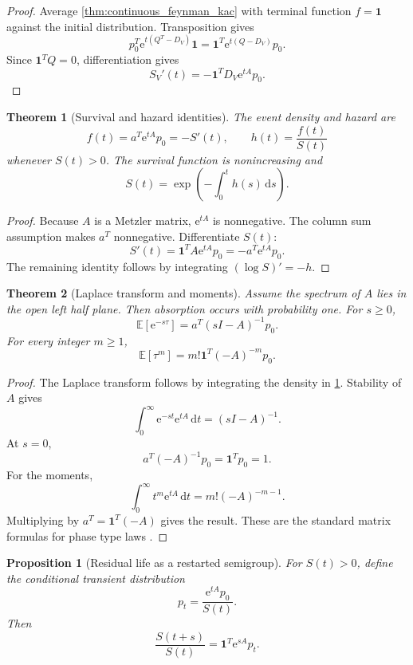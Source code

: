 \documentclass{aomart}
\newtheorem{theorem}{Theorem}[section]
\newtheorem{proposition}[proposition]{Proposition}
\theoremstyle{definition}
\theoremstyle{remark}
\newcommand{\Exp}{\mathbb E}
\newcommand{\e}{\mathrm e}
\newcommand{\one}{\bm 1}
\newcommand{\dd}{\,\mathrm d}
\begin{document}
\begin{proof}
Average \cref{thm:continuous_feynman_kac} with terminal function \(f=\one\) against the initial distribution. Transposition gives
\[
p_0^T\e^{t(Q^T-D_V)}\one
=
\one^T\e^{t(Q-D_V)}p_0.
\]
Since \(\one^TQ=0\), differentiation gives
\[
S_V'(t)
=
-\one^TD_V\e^{tA}p_0.
\]
\end{proof}

\begin{theorem}[Survival and hazard identities]\label{thm:survival_hazard}
The event density and hazard are
\[
f(t)=a^T\e^{tA}p_0=-S'(t),
\qquad
h(t)=\frac{f(t)}{S(t)}
\]
whenever \(S(t)>0\). The survival function is nonincreasing and
\[
S(t)
=
\exp\left(
-\int_0^th(s)\dd s
\right).
\]
\end{theorem}

\begin{proof}
Because \(A\) is a Metzler matrix, \(\e^{tA}\) is nonnegative. The column sum assumption makes \(a^T\) nonnegative. Differentiate \(S(t)\):
\[
S'(t)=\one^TA\e^{tA}p_0=-a^T\e^{tA}p_0.
\]
The remaining identity follows by integrating \((\log S)'=-h\).
\end{proof}

\begin{theorem}[Laplace transform and moments]\label{thm:survival_moments}
Assume the spectrum of \(A\) lies in the open left half plane. Then absorption occurs with probability one. For \(s\geq0\),
\[
\Exp[\e^{-s\tau}]
=
a^T(sI-A)^{-1}p_0.
\] For every integer \(m\geq1\),
\[
\Exp[\tau^m]
=
m!\one^T(-A)^{-m}p_0.
\]
\end{theorem}

\begin{proof}
The Laplace transform follows by integrating the density in \cref{thm:survival_hazard}. Stability of \(A\) gives
\[
\int_0^\infty
\e^{-st}\e^{tA}\dd t
=
(sI-A)^{-1}.
\]
At \(s=0\),
\[
a^T(-A)^{-1}p_0
=
\one^Tp_0=1.
\]
For the moments,
\[
\int_0^\infty t^m\e^{tA}\dd t
=
m!(-A)^{-m-1}.
\]
Multiplying by \(a^T=\one^T(-A)\) gives the result. These are the standard matrix formulas for phase type laws \cite{Neuts1981,AsmussenNermanOlsson1996}.
\end{proof}

\begin{proposition}[Residual life as a restarted semigroup]\label{prop:residual_life}
For \(S(t)>0\), define the conditional transient distribution
\[
p_t
=
\frac{\e^{tA}p_0}{S(t)}.
\]
Then
\[
\frac{S(t+s)}{S(t)}
=
\one^T\e^{sA}p_t.
\]
\end{proposition}
\end{document}
